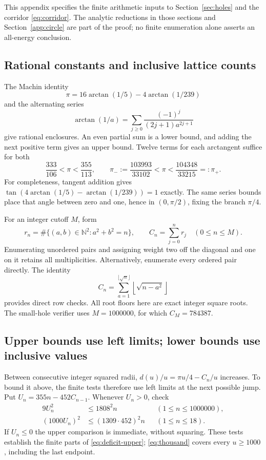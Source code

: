 \documentclass[11pt,reqno]{amsart}
\numberwithin{equation}{section}
\newcommand{\N}{\mathbb N}
\begin{document}
This appendix specifies the finite arithmetic inputs to
Section~\ref{sec:holes} and the corridor \eqref{eq:corridor}.
The analytic reductions in those sections and
Section~\ref{app:circle} are part of the proof; no finite
enumeration alone asserts an all-energy conclusion.

\subsection*{Rational constants and inclusive lattice counts}

The Machin identity
\[
 \pi=16\arctan(1/5)-4\arctan(1/239)
\]
and the alternating series
\[
 \arctan(1/a)=\sum_{j\ge0}\frac{(-1)^j}{(2j+1)a^{2j+1}}
\]
give rational enclosures. An even partial sum is a lower
bound, and adding the next positive term gives an upper
bound. Twelve terms for each arctangent suffice for both
\begin{equation}\label{eq:pi-bracket}
 \frac{333}{106}<\pi<\frac{355}{113},
 \qquad
 \pi_-:=\frac{103993}{33102}<\pi<\frac{104348}{33215}=: \pi_+.
\end{equation}
For completeness, tangent addition gives
$\tan(4\arctan(1/5)-\arctan(1/239))=1$ exactly.
The same series bounds place that angle between zero and
one, hence in $(0,\pi/2)$, fixing the branch $\pi/4$.

For an integer cutoff $M$, form
\begin{equation}\label{eq:count-array}
 r_n=\#\{(a,b)\in\N^2:a^2+b^2=n\},\qquad
 C_n=\sum_{j=0}^n r_j\quad(0\le n\le M).
\end{equation}
Enumerating unordered pairs and assigning weight two off
the diagonal and one on it retains all multiplicities.
Alternatively, enumerate every ordered pair directly.
The identity
\begin{equation}\label{eq:count-row}
 C_n=\sum_{a=1}^{\lfloor\sqrt n\rfloor}
                 \left\lfloor\sqrt{n-a^2}\right\rfloor
\end{equation}
provides direct row checks. All root floors here are exact
integer square roots. The small-hole verifier uses
$M=1000000$, for which $C_M=784387$.

\subsection*{Upper bounds use left limits; lower bounds use inclusive values}

Between consecutive integer squared radii,
$d(u)/u=\pi u/4-C_n/u$ increases. To bound it above, the
finite tests therefore use left limits at the next possible
jump. Put $U_n=355n-452C_{n-1}$. Whenever $U_n>0$, check
\begin{align}
 9U_n^2&\le1808^2n
      &&(1\le n\le1000000),\label{eq:cert-upper}\\
 (1000U_n)^2&\le(1309\cdot452)^2n
      &&(1\le n\le18).\label{eq:cert-prefix}
\end{align}
If $U_n\le0$ the upper comparison is immediate, without
squaring. These tests establish the finite parts of
\eqref{eq:deficit-upper}; \eqref{eq:thousand} covers every
$u\ge1000$, including the last endpoint.
\end{document}
